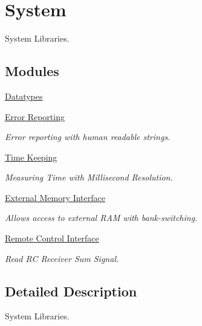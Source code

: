 \hypertarget{group___system}{\section{System}
\label{group___system}
}


System Libraries.  


\subsection*{Modules}
\begin{DoxyCompactItemize}
\item 
\hyperlink{group__datatypes}{Datatypes}
\item 
\hyperlink{group__error}{Error Reporting}
\begin{DoxyCompactList}\small\item\em Error reporting with human readable strings. \end{DoxyCompactList}\item 
\hyperlink{group__time}{Time Keeping}
\begin{DoxyCompactList}\small\item\em Measuring Time with Millisecond Resolution. \end{DoxyCompactList}\item 
\hyperlink{group__xmem}{External Memory Interface}
\begin{DoxyCompactList}\small\item\em Allows access to external R\-A\-M with bank-\/switching. \end{DoxyCompactList}\item 
\hyperlink{group__remote}{Remote Control Interface}
\begin{DoxyCompactList}\small\item\em Read R\-C Receiver Sum Signal. \end{DoxyCompactList}\end{DoxyCompactItemize}


\subsection{Detailed Description}
System Libraries. 